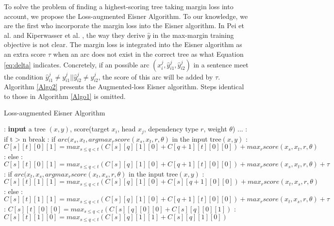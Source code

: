 To solve the problem of finding a highest-scoring tree taking margin loss into account, we propose the Loss-augmented Eisner Algorithm. To our knowledge, we are the first who incorporate the margin loss into the Eisner algorithm. In Pei et al. \cite{pei2015} and Kiperwasser et al. \cite{kiperwasser2016simple}, the way they derive $\hat{y}$ in the max-margin training objective is not clear. The margin loss is integrated into the Eisner algorithm as an extra score $\tau$ when an arc does not exist in the correct tree as what Equation \ref{eq:delta} indicates. Concretely, if an possible arc $(x_i^j,\hat{y}_{i1}^j,\hat{y}_{i2}^j)$ in a sentence meet the condition $\hat{y}_{i1}^j\neq y_{i1}^j|| \hat{y}_{i2}^j\neq y_{i2}^j$, the score of this arc will be added by $\tau$.
 Algorithm \ref{Algo2} presents the Augmented-loss Eisner algorithm. Steps identical to those in Algorithm \ref{Algo1} is omitted.
\begin{algorithm}
\caption{Loss-augmented Eisner Algorithm}
\label{Algo2}
\begin{algorithmic}
: \textbf{input} a tree $(x,y)$, score(target $x_i$, head $x_j$, dependency type $r$, weight $\theta$) 
\STATE ...
: if t > n break
:  \hspace{2mm}if $arc(x_s,x_t,argmax_r score(x_s,x_t,r,\theta)$ in the input tree$(x,y)$
:  \hspace{5.75mm}$C[s][t][0][1]=max_{s\leq q<t}(C[s][q][1][0]+C[q+1][t][0][0])+max_r score(x_s,x_t,r,\theta)$
:  \hspace{2mm}else
: \hspace{4mm}$C[s][t][0][1]=max_{s\leq q<t}(C[s][q][1][0]+C[q+1][t][0][0])+max_r score(x_s,x_t,r,\theta)+\tau$
: \hspace{0.5mm}if $arc(x_t,x_s,argmax_r score(x_t,x_s,r,\theta)$ in the input tree$(x,y)$
: \hspace{4mm}$C[s][t][1][1]=max_{s\leq q<t}(C[s][q][1][0]+C[s][q+1][0][0])+max_r score(x_t,x_s,r,\theta)$
: \hspace{0.5mm}else
: \hspace{4mm}$C[s][t][1][1]=max_{s\leq q<t}(C[s][q][1][0]+C[q+1][t][0][0])+max_r score(x_t,x_s,r,\theta)+\tau$
: \hspace{0.5mm}$C[s][t][0][0]=max_{s\leq q<t}(C[s][q][0][0]+C[s][q][0][1])$
: \hspace{0.5mm}$C[s][t][1][0]=max_{s\leq q<t}(C[s][q][1][1]+C[s][q][1][0])$
\end{algorithmic}
\end{algorithm}

